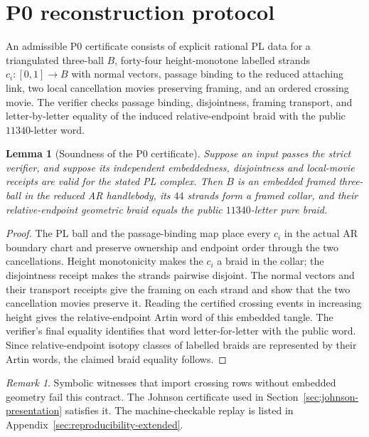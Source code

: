 \documentclass[11pt]{amsart}
\newtheorem{lemma}[theorem]{Lemma}
\theoremstyle{definition}
\theoremstyle{remark}
\newtheorem{remark}[theorem]{Remark}
\begin{document}


\section{P0 reconstruction protocol}\label{app:p0-reconstruction}

An admissible P0 certificate consists of explicit rational PL data for a
triangulated three-ball $B$, forty-four height-monotone labelled strands
$c_i:[0,1]\to B$ with normal vectors, passage binding to the reduced
attaching link, two local cancellation movies preserving framing, and an
ordered crossing movie.  The verifier checks passage binding, disjointness,
framing transport, and letter-by-letter equality of the induced
relative-endpoint braid with the public $11340$-letter word.

\begin{lemma}[Soundness of the P0 certificate]
Suppose an input passes the strict verifier, and suppose its independent
embeddedness, disjointness and local-movie receipts are valid for the stated
PL complex.  Then $B$ is an embedded framed three-ball in the reduced AR
handlebody, its $44$ strands form a framed collar, and their relative-endpoint
geometric braid equals the public $11340$-letter pure braid.
\end{lemma}

\begin{proof}
The PL ball and the passage-binding map place every $c_i$ in the actual AR
boundary chart and preserve ownership and endpoint order through the two
cancellations.  Height monotonicity makes the $c_i$ a braid in the collar;
the disjointness receipt makes the strands pairwise disjoint.  The normal
vectors and their transport receipts give the framing on each strand and
show that the two cancellation movies preserve it.  Reading the certified
crossing events in increasing height gives the relative-endpoint Artin word
of this embedded tangle.  The verifier's final equality identifies that word
letter-for-letter with the public word.  Since relative-endpoint isotopy
classes of labelled braids are represented by their Artin words, the claimed
braid equality follows.
\end{proof}

\begin{remark}
Symbolic witnesses that import crossing rows without embedded geometry fail
this contract.  The Johnson certificate used in Section~\ref{sec:johnson-presentation}
satisfies it.  The machine-checkable replay is listed in
Appendix~\ref{sec:reproducibility-extended}.
\end{remark}
\end{document}
